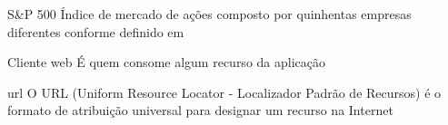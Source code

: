\begin{siglas}
    \item[S\&P 500] Índice de mercado de ações composto por
                    quinhentas empresas diferentes conforme definido
                    em 

    \item[Cliente web] É quem consome algum recurso da aplicação
    
    \item[url] O URL (Uniform Resource Locator - Localizador Padrão de Recursos) 
    é o formato de atribuição universal para designar um recurso na Internet
\end{siglas}
